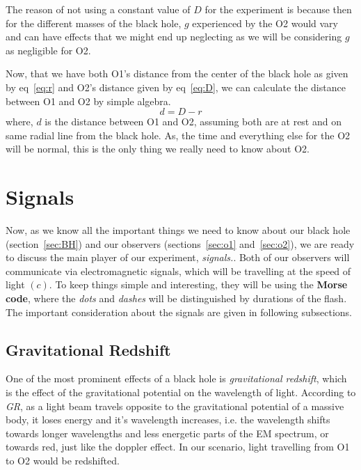 The reason of not using a constant value of \(D\) for the experiment is because then for the different masses of the black hole, \(g\) experienced by the O2 would vary and can have effects that we might end up neglecting 
as we will be considering \(g\) as negligible for O2. 

Now, that we have both O1's distance from the center of the black hole as given by eq~\ref{eq:r} and O2's distance given by eq~\ref{eq:D}, we can calculate
the distance between O1 and O2 by simple algebra. 
\begin{equation}\label{eq:d}
    d = D - r \tag{3.14}
\end{equation}
where, \(d\) is the distance between O1 and O2, assuming both are at rest and on same radial line from the black hole. As, the time and everything else for the O2 
will be normal, this is the only thing we really need to know about O2. 

\section{Signals}\label{sec:signal}

Now, as we know all the important things we need to know about our black hole (section~\ref{sec:BH}) and our observers (sections~\ref{sec:o1} and~\ref{sec:o2}), we 
are ready to discuss the main player of our experiment, \emph{signals.}. Both of our observers will communicate via electromagnetic signals, which will be travelling
at the speed of light \((c)\). To keep things simple and interesting, they will be using the \textbf{Morse code}, where the \emph{dots} and \emph{dashes} will be
distinguished by durations of the flash. The important consideration about the signals are given in following subsections. 

\subsection{Gravitational Redshift}\label{subsec:Redshift}

One of the most prominent effects of a black hole is \emph{gravitational redshift}, which is the effect of the gravitational potential on the wavelength of light.
According to \emph{GR}, as a light beam travels opposite to the gravitational potential of a massive body, it loses energy and it's wavelength increases, i.e. the wavelength shifts towards
longer wavelengths and less energetic parts of the EM spectrum, or towards red, just like the doppler effect. In our scenario, light travelling from O1 to O2 would be redshifted.


